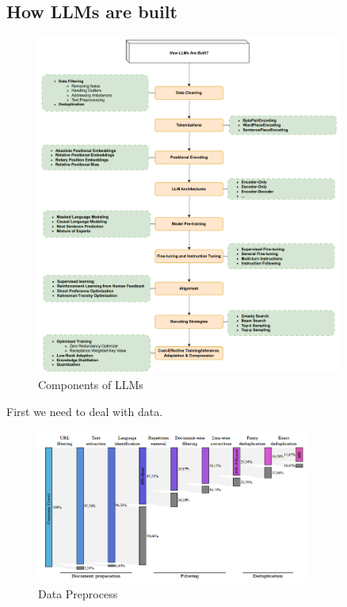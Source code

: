 \documentclass[10pt]{elegantbook}
\begin{document}
\subsection{How LLMs are built}
\begin{figure}[htbp]
    \centering
    \includegraphics[width=0.90\textwidth]{image/how_llm_works.png}
    \caption{Components of LLMs}
    \label{fig:how_llm_works}
\end{figure}

First we need to deal with data.
\begin{figure}[htbp]
    \centering
    \includegraphics[width=0.80\textwidth]{image/data_process.png}
    \caption{Data Preprocess}
    \label{fig:data_process}
\end{figure}
\end{document}
